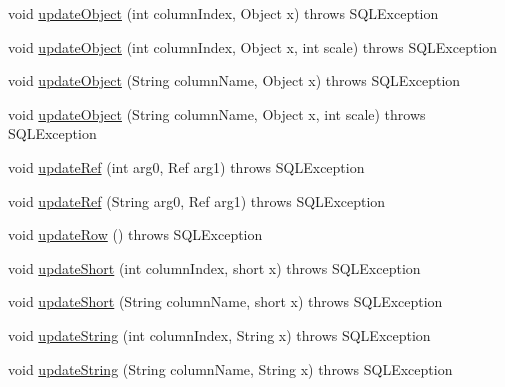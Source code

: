 \begin{DoxyCompactItemize}
\item 
void \mbox{\hyperlink{classcom_1_1mysql_1_1cj_1_1jdbc_1_1result_1_1_result_set_impl_a8826b2a398d1efecd365db9d436e3987}{update\+Object}} (int column\+Index, Object x)  throws S\+Q\+L\+Exception 
\item 
void \mbox{\hyperlink{classcom_1_1mysql_1_1cj_1_1jdbc_1_1result_1_1_result_set_impl_ae9852e5150820461d1e1e7d5f09b1770}{update\+Object}} (int column\+Index, Object x, int scale)  throws S\+Q\+L\+Exception 
\item 
void \mbox{\hyperlink{classcom_1_1mysql_1_1cj_1_1jdbc_1_1result_1_1_result_set_impl_ad6b76152160d9b840e8904f5aff193ea}{update\+Object}} (String column\+Name, Object x)  throws S\+Q\+L\+Exception 
\item 
void \mbox{\hyperlink{classcom_1_1mysql_1_1cj_1_1jdbc_1_1result_1_1_result_set_impl_abffa5ce5112562274b4ddba5bfb68d6e}{update\+Object}} (String column\+Name, Object x, int scale)  throws S\+Q\+L\+Exception 
\item 
void \mbox{\hyperlink{classcom_1_1mysql_1_1cj_1_1jdbc_1_1result_1_1_result_set_impl_a675edcd78b9e9d76a277a2a58ce17d2e}{update\+Ref}} (int arg0, Ref arg1)  throws S\+Q\+L\+Exception 
\item 
void \mbox{\hyperlink{classcom_1_1mysql_1_1cj_1_1jdbc_1_1result_1_1_result_set_impl_a424800ca1453bb55aa6ae2d15ea5fe1b}{update\+Ref}} (String arg0, Ref arg1)  throws S\+Q\+L\+Exception 
\item 
void \mbox{\hyperlink{classcom_1_1mysql_1_1cj_1_1jdbc_1_1result_1_1_result_set_impl_a33db098f120558983f3c05386352ee44}{update\+Row}} ()  throws S\+Q\+L\+Exception 
\item 
void \mbox{\hyperlink{classcom_1_1mysql_1_1cj_1_1jdbc_1_1result_1_1_result_set_impl_a38c521e0192fcf943f61658082e5ecba}{update\+Short}} (int column\+Index, short x)  throws S\+Q\+L\+Exception 
\item 
void \mbox{\hyperlink{classcom_1_1mysql_1_1cj_1_1jdbc_1_1result_1_1_result_set_impl_aceaa3a49c64168df2eac52d8ed10579e}{update\+Short}} (String column\+Name, short x)  throws S\+Q\+L\+Exception 
\item 
void \mbox{\hyperlink{classcom_1_1mysql_1_1cj_1_1jdbc_1_1result_1_1_result_set_impl_ac7acb97fae07a54c1ea0b7f00771bacf}{update\+String}} (int column\+Index, String x)  throws S\+Q\+L\+Exception 
\item 
void \mbox{\hyperlink{classcom_1_1mysql_1_1cj_1_1jdbc_1_1result_1_1_result_set_impl_a79430168874e9e7f24ccc9aa88da1dca}{update\+String}} (String column\+Name, String x)  throws S\+Q\+L\+Exception 

\end{DoxyCompactItemize}
